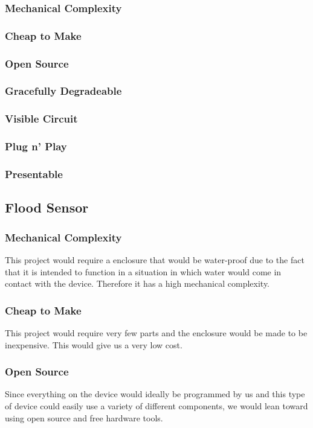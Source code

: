 \documentclass{article}
\begin{document}
\subsubsection {Mechanical Complexity}

\subsubsection{Cheap to Make}

\subsubsection{Open Source}

\subsubsection{Gracefully Degradeable}

\subsubsection{Visible Circuit}

\subsubsection{Plug n' Play}

\subsubsection{Presentable}


\subsection{Flood Sensor}
\subsubsection {Mechanical Complexity}
This project would require a enclosure that would be water-proof due to the
fact that it is intended to function in a situation in which water would come
in contact with the device. Therefore it has a high mechanical complexity.
\subsubsection{Cheap to Make}
This project would require very few parts and the enclosure would be made to be
inexpensive. This would give us a very low cost.
\subsubsection{Open Source}
Since everything on the device would ideally be programmed by us and this type
of device could easily use a variety of different components, we would lean
toward using open source and free hardware tools.
\end{document}
